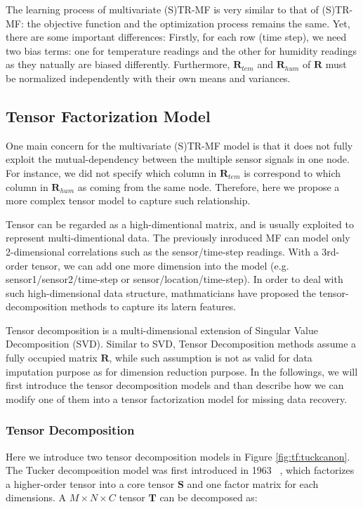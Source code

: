 The learning process of multivariate (S)TR-MF is very similar to that of (S)TR-MF: the objective function and the optimization process remains the same. Yet, there are some important differences: 
Firstly, for each row (time step), we need two bias terms: one for temperature readings and the other for humidity readings as they natually are biased differently. Furthermore, $\mathbf{R}_{tem}$ and $\mathbf{R}_{hum}$ of $\mathbf{R}$ must be normalized independently with their own means and variances. 

 
\subsection{Tensor Factorization Model} \label{sec:tensordecomp}

One main concern for the multivariate (S)TR-MF model is that it does not fully exploit the mutual-dependency between the multiple sensor signals in one node. For instance, we did not specify which column in $\mathbf{R}_{tem}$ is correspond to which column in $\mathbf{R}_{hum}$ as coming from the same node. Therefore, here we propose a more complex tensor model to capture such relationship. 

Tensor can be regarded as a high-dimentional matrix, and is usually exploited to represent multi-dimentional data. The previously inroduced MF can model only 2-dimensional correlations such as the sensor/time-step readings. With a 3rd-order tensor, we can add one more dimension into the model (e.g. sensor1/sensor2/time-step or sensor/location/time-step). In order to deal with such high-dimensional data structure, mathmaticians have proposed the tensor-decomposition methods to capture its latern features. 

Tensor decomposition is a multi-dimensional extension of Singular Value Decomposition (SVD). Similar to SVD, Tensor Decomposition methods assume a fully occupied matrix $\mathbf{R}$, while such assumption is not as valid for data imputation purpose as for dimension reduction purpose.
In the followings, we will first introduce the tensor decomposition models and than describe how we can modify one of them into a tensor factorization model for missing data recovery. 

 
\subsubsection{Tensor Decomposition}
Here we introduce two tensor decomposition models in Figure \ref{fig:tf:tuckcanon}. The Tucker decomposition model was first introduced in 1963 ~\cite{tucker1963TF}, which factorizes a higher-order tensor into a core tensor $\mathbf{S}$ and one factor matrix for each dimensions.
A $M\times N \times C $ tensor $\mathbf{T}$ can be decomposed as:

